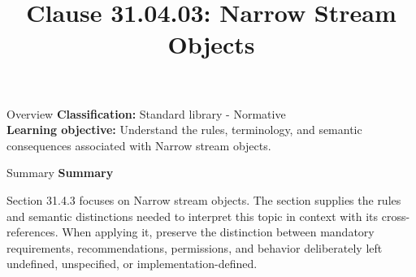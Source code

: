 \documentclass[10pt,letterpaper]{article}
\title{Clause 31.04.03: Narrow Stream Objects}
\author{}
\date{}
\begin{document}
\maketitle
\begin{CornellOverviewBox}{Overview}
\textbf{Classification:} Standard library - Normative\\[2pt]
\textbf{Learning objective:} Understand the rules, terminology, and semantic consequences associated with Narrow stream objects.
\end{CornellOverviewBox}\begin{CornellSummaryBox}{Summary}
{\sffamily\bfseries\color{Accent} Summary}\par\vspace{3pt}Section 31.4.3 focuses on Narrow stream objects. The section supplies the rules and semantic distinctions needed to interpret this topic in context with its cross-references. When applying it, preserve the distinction between mandatory requirements, recommendations, permissions, and behavior deliberately left undefined, unspecified, or implementation-defined.
\end{CornellSummaryBox}
\end{document}
